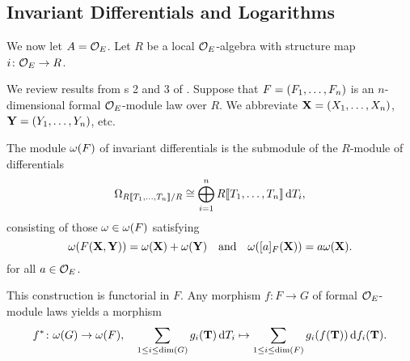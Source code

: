 \documentclass[../main.tex]{subfiles}
\begin{document}

\subsection{Invariant Differentials and Logarithms} %
\label{sub:Logarithms}
We now let $A = {\mathcal{O}_E}$. Let $R$ be a local ${\mathcal{O}_E}$-algebra with structure
map $i\colon  {\mathcal{O}_E} \to R$.

We review results from s
2 and 3 of \cite{hopkins1994equivariant}. 
Suppose that ${F} = (F_1, \dots, F_n)$ is an $n$-dimensional formal ${\mathcal{O}_E}$-module
law over $R$. We abbreviate $\mathbf{X} = (X_1, \dots, X_n)$, $\mathbf{Y} = (Y_1,
\dots, Y_n)$, etc.

\begin{defi}
  The module $\omega({F})$ of invariant differentials is the submodule of the
  $R$-module of differentials
  \begin{equation*}
    \Omega_{R\llbracket T_1, \dots, T_n \rrbracket/R} \cong \bigoplus_{i=1}^n R\llbracket T_1,
    \dots, T_n
    \rrbracket \, \mathrm{d} T_i,
  \end{equation*}
  consisting of those $\omega \in \omega({F})$ satisfying
  \begin{equation}\label{eq:diffcond}
    \omega({F}(\mathbf{X},\mathbf{Y})) = \omega(\mathbf{X}) + \omega(\mathbf{Y})\quad \text{and} \quad
    \omega([a]_{F}(\mathbf{X})) = a\omega(\mathbf{X}).
  \end{equation} 
  for all $a \in {\mathcal{O}_E}$. 
\end{defi}

This construction is functorial in $F$. Any morphism $f\colon F \to G$ 
of formal ${\mathcal{O}_E}$-module laws yields a morphism 
$$ f^*\colon \omega(G) \to \omega(F), \quad \sum_{1 \leq i \leq \dim(G)} g_i(\mathbf T)
\, \mathrm{d} T_i  \mapsto \sum_{1 \leq i \leq \dim(F)} g_i(f(\mathbf T)) \, \mathrm{d} f_i(\mathbf T).$$
\end{document}
